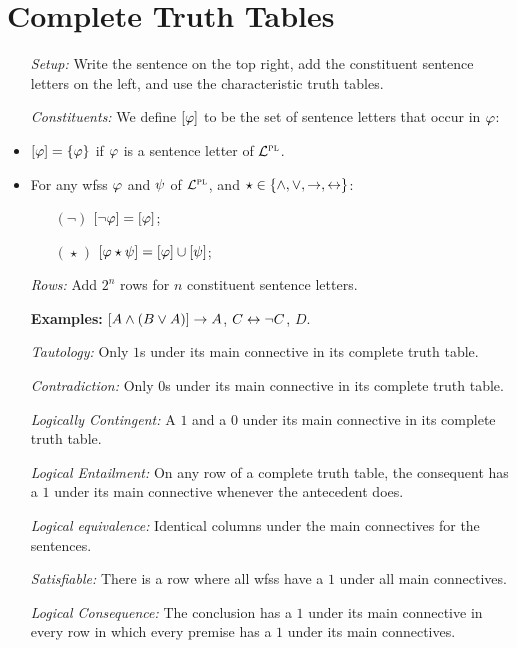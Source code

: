 \documentclass[a4paper, 11pt]{article} %
\begin{document}
\section*{Complete Truth Tables}

\begin{itemize}[leftmargin=.75in,labelsep=.15in] %
  \item[\it Setup:] Write the sentence on the top right, add the constituent sentence letters on the left, and use the characteristic truth tables.
  \item[\it Constituents:] We define $[\varphi]$ to be the set of sentence letters that occur in $\varphi$: %
      \item $[\varphi]=\lbrace\varphi\rbrace$ if $\varphi$ is a sentence letter of $\mathcal{L}^{\textsc{pl}}$.
      \item For any wfss $\varphi$ and $\psi$ of $\mathcal{L}^{\textsc{pl}}$, and $\star \in \lbrace\wedge,\vee,\rightarrow,\leftrightarrow\rbrace$: 
    \begin{itemize}
      \item[$(\neg)$] $[\neg \varphi]=[\varphi]$;
      \item[$(\hspace{1pt}\star\hspace{1pt})$] $[\varphi \star \psi]=[\varphi] \cup [\psi]$;
    \end{itemize}
  \item[\it Rows:] Add $2^n$ rows for $n$ constituent sentence letters.
  \item[\bf Examples:] $[A \wedge (B \vee A)] \rightarrow A$, $C \leftrightarrow \neg C$, $D$.
  \item[\it Tautology:] Only $1$s under its main connective in its complete truth table.
  \item[\it Contradiction:] Only $0$s under its main connective in its complete truth table.
  \item[\it Logically Contingent:] A $1$ and a $0$ under its main connective in its complete truth table.
  \item[\it Logical Entailment:] On any row of a complete truth table, the consequent has a $1$ under its main connective whenever the antecedent does. 
  \item[\it Logical equivalence:] Identical columns under the main connectives for the sentences.
  \item[\it Satisfiable:] There is a row where all wfss have a $1$ under all main connectives. 
  \item[\it Logical Consequence:] The conclusion has a $1$ under its main connective in every row in which every premise has a $1$ under its main connectives.
\end{itemize}
\end{document}
